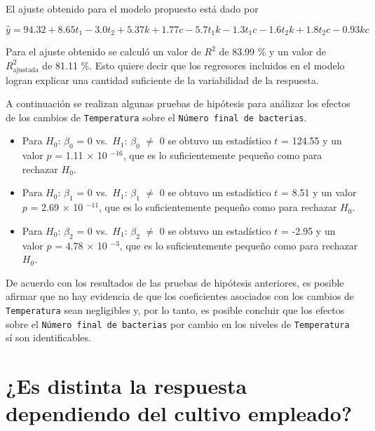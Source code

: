 \documentclass[10pt, spanish]{article}
\providecommand{\tightlist}{%
      \setlength{\itemsep}{0pt}\setlength{\parskip}{0pt}}
\begin{document}
    El ajuste obtenido para el modelo propuesto está dado por

    $$\hat{y} =  94.32 + 8.65{t}_1 - 3.0{t}_2 + 5.37{k} + 1.77{c} - 5.7{t}_1{k} - 1.3{t}_1{c} - 1.6{t}_2{k} + 1.8{t}_2{c} - 0.93{k}{c}$$


    Para el ajuste obtenido se calculó un valor de \(R^2\) de 83.99 \% y un
valor de \(R^2_{\text{ajustada}}\) de 81.11 \%. Esto quiere decir que
los regresores incluidos en el modelo logran explicar una cantidad
suficiente de la variabilidad de la respuesta.


    A continuación se realizan algunas pruebas de hipótesis para análizar
los efectos de los cambios de \texttt{Temperatura} sobre el
\texttt{Número\ final\ de\ bacterias}.

    \begin{itemize}
\tightlist
\item
  Para \(H_0\): \(\beta_0\) = 0 vs.~\(H_1\): \(\beta_0\) \(\neq\) 0 se
  obtuvo un estadístico \(t\) = 124.55 y un valor \(p\) = 1.11
  \(\times\) 10 \(^{-16}\), que es lo suficientemente pequeño como para
  rechazar \(H_0\).
\end{itemize}


    \begin{itemize}
\tightlist
\item
  Para \(H_0\): \(\beta_1\) = 0 vs.~\(H_1\): \(\beta_1\) \(\neq\) 0 se
  obtuvo un estadístico \(t\) = 8.51 y un valor \(p\) = 2.69 \(\times\)
  10 \(^{-11}\), que es lo suficientemente pequeño como para rechazar
  \(H_0\).
\end{itemize}


    \begin{itemize}
\tightlist
\item
  Para \(H_0\): \(\beta_2\) = 0 vs.~\(H_1\): \(\beta_2\) \(\neq\) 0 se
  obtuvo un estadístico \(t\) = -2.95 y un valor \(p\) = 4.78 \(\times\)
  10 \(^{-3}\), que es lo suficientemente pequeño como para rechazar \(H_0\).
\end{itemize}


    De acuerdo con los resultados de las pruebas de hipótesis anteriores, es
posible afirmar que no hay evidencia de que los coeficientes asociados
con los cambios de \texttt{Temperatura} sean negligibles y, por lo
tanto, es posible concluir que los efectos sobre el
\texttt{Número\ final\ de\ bacterias} por cambio en los niveles de
\texttt{Temperatura} sí son identificables.

    \hypertarget{es-distinta-la-respuesta-dependiendo-del-cultivo-empleado}{%
\section{¿Es distinta la respuesta dependiendo del cultivo
empleado?}\label{es-distinta-la-respuesta-dependiendo-del-cultivo-empleado}}
\end{document}
